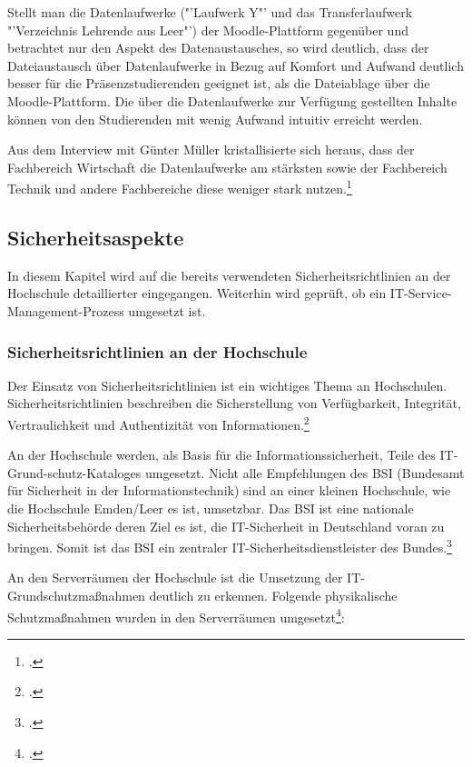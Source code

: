 Stellt man die Datenlaufwerke ("'Laufwerk Y"' und das Transferlaufwerk "'Verzeichnis Lehrende aus Leer"') der Moodle-Plattform gegenüber und betrachtet nur den Aspekt des Datenaustausches, so wird deutlich, dass der Dateiaustausch über Datenlaufwerke in Bezug auf Komfort und Aufwand deutlich besser für die Präsenzstudierenden geeignet ist, als die Dateiablage über die Moodle-Plattform. Die über die Datenlaufwerke zur Verfügung gestellten Inhalte können von den Studierenden mit wenig Aufwand intuitiv erreicht werden.

Aus dem Interview mit Günter Müller kristallisierte sich heraus, dass der Fachbereich Wirtschaft die Datenlaufwerke am stärksten sowie der Fachbereich Technik und andere Fachbereiche diese weniger stark nutzen.\footcite{gunter_muller_interview}

\subsection{Sicherheitsaspekte}
\label{subsection_sicherheitsaspekte}
In diesem Kapitel wird auf die bereits verwendeten Sicherheitsrichtlinien an der Hochschule detaillierter eingegangen. Weiterhin wird geprüft, ob ein IT-Service-Management-Prozess  umgesetzt ist.

\subsubsection{Sicherheitsrichtlinien an der Hochschule}
Der Einsatz von Sicherheitsrichtlinien ist ein wichtiges Thema an Hochschulen. Sicherheitsrichtlinien beschreiben die Sicherstellung von Verfügbarkeit, Integrität, Vertraulichkeit und Authentizität von Informationen.\footcite[Vgl.][]{sicherheitsrichtlinien_datenschutz-berlin.de_2008}

An der Hochschule werden, als Basis für die Informationssicherheit, Teile des IT-Grund-schutz-Kataloges umgesetzt. Nicht alle Empfehlungen des BSI (Bundesamt für Sicherheit in der Informationstechnik) sind an einer kleinen Hochschule, wie die Hochschule Emden/Leer es ist,  umsetzbar. Das BSI ist eine nationale Sicherheitsbehörde deren Ziel es ist, die IT-Sicherheit in Deutschland voran zu bringen. Somit ist das BSI ein zentraler IT-Sicherheitsdienstleister des Bundes.\footcite[Vgl.][]{sicherheitsrichtlinien_bsi.bund.de_2015}

An den Serverräumen der Hochschule ist die Umsetzung der IT-Grundschutzmaßnahmen deutlich zu erkennen.
Folgende physikalische Schutzmaßnahmen wurden in den Serverräumen umgesetzt\footcite{gunter_muller_interview}:

